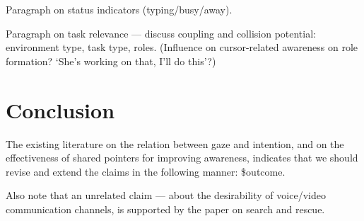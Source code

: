 \documentclass{acm_proc_article-sp}
\begin{document}
Paragraph on status indicators (typing/busy/away).

Paragraph on task relevance --- discuss coupling and collision potential: environment type, task type, roles. (Influence on cursor-related awareness on role formation? `She's working on that, I'll do this'?)

\section{Conclusion}

The existing literature on the relation between gaze and intention, and on the effectiveness of shared pointers for improving awareness, indicates that we should revise and extend the claims in the following manner: \$outcome. 

Also note that an unrelated claim --- about the desirability of voice/video communication channels, is supported by the paper on search and rescue.






\end{document}

